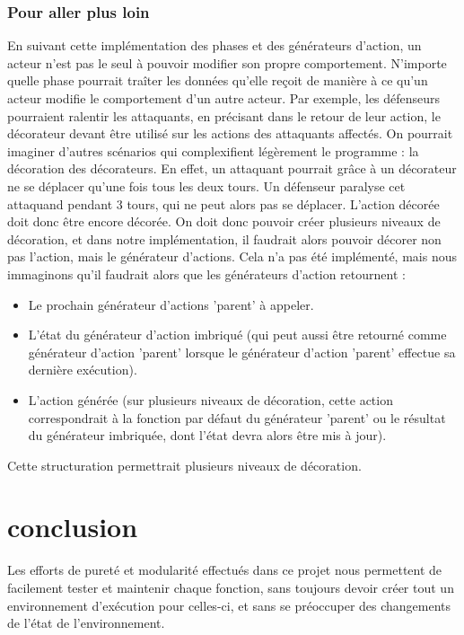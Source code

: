 \documentclass{article}
\begin{document}
\subsubsection{Pour aller plus loin}

En suivant cette implémentation des phases et des générateurs d'action, un acteur n'est pas le seul à pouvoir modifier son propre comportement. N'importe quelle phase pourrait traîter les données qu'elle reçoit de manière à ce qu'un acteur modifie le comportement d'un autre acteur. Par exemple, les défenseurs pourraient ralentir les attaquants, en précisant dans le retour de leur action, le décorateur devant être utilisé sur les actions des attaquants affectés.
On pourrait imaginer d'autres scénarios qui complexifient légèrement le programme : la décoration des décorateurs. En effet, un attaquant pourrait grâce à un décorateur ne se déplacer qu'une fois tous les deux tours. Un défenseur paralyse cet attaquand pendant 3 tours, qui ne peut alors pas se déplacer. L'action décorée doit donc être encore décorée. On doit donc pouvoir créer plusieurs niveaux de décoration, et dans notre implémentation, il faudrait alors pouvoir décorer non pas l'action, mais le générateur d'actions. Cela n'a pas été implémenté, mais nous immaginons qu'il faudrait alors que les générateurs d'action retournent :
\begin{itemize}
    \item Le prochain générateur d'actions 'parent' à appeler.
    \item L'état du générateur d'action imbriqué (qui peut aussi être retourné comme générateur d'action 'parent' lorsque le générateur d'action 'parent' effectue sa dernière exécution).
    \item L'action générée (sur plusieurs niveaux de décoration, cette action correspondrait à la fonction par défaut du générateur 'parent' ou le résultat du générateur imbriquée, dont l'état devra alors être mis à jour).
\end{itemize}

Cette structuration permettrait plusieurs niveaux de décoration.

\section{conclusion}

Les efforts de pureté et modularité effectués dans ce projet nous permettent de facilement tester et maintenir chaque fonction, sans toujours devoir créer tout un environnement d'exécution pour celles-ci, et sans se préoccuper des changements de l'état de l'environnement.
\end{document}
